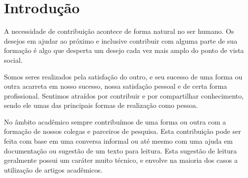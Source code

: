 \documentclass[
	12pt,               %
	openright,          %
	twoside,            %
	a4paper,            %
	english,            %
	brazil              %
	]{abntex2}
\begin{document}
\listoffigures*
\cleardoublepage

\listoftables*
\cleardoublepage




\tableofcontents*
\cleardoublepage



\textual

\chapter[Introdução]{Introdução}

A necessidade de contribuição acontece de forma natural no ser humano. Os desejos em ajudar ao próximo e inclusive contribuir com alguma parte de sua formação é algo que desperta um desejo cada vez mais amplo do ponto de vista social.

Somos seres realizados pela satisfação do outro, e seu sucesso de uma forma ou outra acarreta em nosso sucesso, nossa satisfação pessoal e de certa forma profissional. Sentimos atraídos por contribuir e por compartilhar conhecimento, sendo ele umas das principais formas de realização como pessoa.

No âmbito acadêmico sempre contribuímos de uma forma ou outra com a formação de nossos colegas e parceiros de pesquisa. Esta contribuição pode ser feita com base em uma conversa informal ou até mesmo com uma ajuda em documentação ou sugestão de um texto para leitura. Esta sugestão de leitura geralmente possui um caráter muito técnico, e envolve na maioria dos casos a utilização de artigos acadêmicos.
\end{document}
